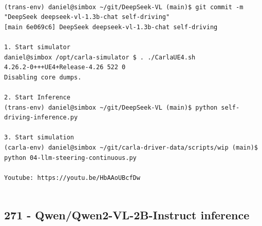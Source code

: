 \begin{verbatim}

(trans-env) daniel@simbox ~/git/DeepSeek-VL (main)$ git commit -m "DeepSeek deepseek-vl-1.3b-chat self-driving"
[main 6e069c6] DeepSeek deepseek-vl-1.3b-chat self-driving

1. Start simulator
daniel@simbox /opt/carla-simulator $ . ./CarlaUE4.sh 
4.26.2-0+++UE4+Release-4.26 522 0
Disabling core dumps.

2. Start Inference
(trans-env) daniel@simbox ~/git/DeepSeek-VL (main)$ python self-driving-inference.py

3. Start simulation
(carla-env) daniel@simbox ~/git/carla-driver-data/scripts/wip (main)$ python 04-llm-steering-continuous.py

Youtube: https://youtu.be/HbAAoUBcfDw
    
\end{verbatim}

\subsection{271 - Qwen/Qwen2-VL-2B-Instruct inference}
\label{app_res:271}

